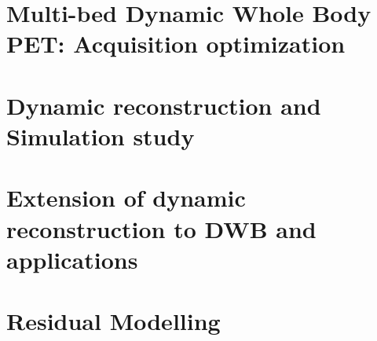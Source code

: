 
\chapter{Multi-bed Dynamic Whole Body PET: Acquisition optimization}
\label{Chap3_1:AcquisitionOptimization}


\chapter{Dynamic reconstruction and Simulation study}
\label{Chap3_2:SimStudy}


\chapter{Extension of dynamic reconstruction to DWB and applications}
\label{Chap3_3:IsotoPK}


\chapter{Residual Modelling}
\label{Chap3_4:Residual}
